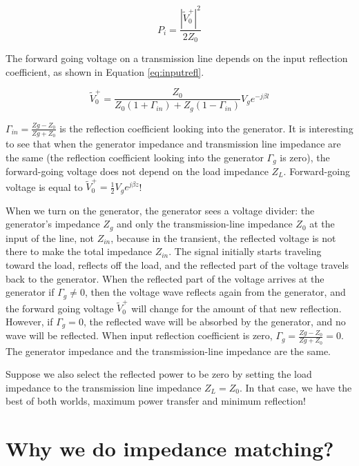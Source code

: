 \documentclass{ximera}
\begin{document}
\begin{equation}
P_i=\frac{|\tilde{V}_0^+|^2}{2 Z_0}
\end{equation}


The forward going voltage on a transmission line depends on the input reflection coefficient, as shown in Equation \ref{eq:inputrefl}.

\begin{equation}
\tilde{V}_0^+=\frac{Z_0}{Z_0(1+\Gamma_{in})+Z_g(1-\Gamma_{in})}V_g e^{-j\beta l}\label{eq:inputrefl}
\end{equation}

$\Gamma_{in}=\frac{Zg-Z_0}{Zg+Z_0}$ is the reflection coefficient looking into the generator. It is interesting to see that when the generator impedance and transmission line impedance are the same (the reflection coefficient looking into the generator $\Gamma_{g}$ is zero), the forward-going voltage does not depend on the load impedance $Z_L$. Forward-going voltage is equal to $\tilde{V}_0^+=\frac{1}{2} V_g e^{j \beta z}$! 

When we turn on the generator, the generator sees a voltage divider: the generator's impedance $Z_g$ and only the transmission-line impedance $Z_0$ at the input of the line, not $Z_{in}$, because in the transient, the reflected voltage is not there to make the total impedance $Z_{in}$. The signal initially starts traveling toward the load, reflects off the load, and the reflected part of the voltage travels back to the generator. When the reflected part of the voltage arrives at the generator if $\Gamma_{g}\neq 0$, then the voltage wave reflects again from the generator, and the forward going voltage $\tilde{V}_0^+$ will change for the amount of that new reflection. However, if $\Gamma_{g}= 0$, the reflected wave will be absorbed by the generator, and no wave will be reflected. When input reflection coefficient is zero, $\Gamma_{g}=\frac{Zg-Z_0}{Zg+Z_0} = 0$. The generator impedance and the transmission-line impedance are the same.

Suppose we also select the reflected power to be zero by setting the load impedance to the transmission line impedance $Z_L=Z_0$. In that case, we have the best of both worlds, maximum power transfer and minimum reflection!


\section{Why we do impedance matching?}
\end{document}
